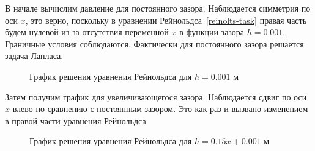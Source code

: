 \documentclass[a4paper,14pt]{extarticle}
\begin{document}
В начале вычислим давление для постоянного зазора. Наблюдается симметрия по оси $x$, это верно, поскольку в уравнении Рейнольдса~\eqref{reinolts-task} правая часть будем нулевой из-за отсутствия переменной $x$ в функции зазора $h = 0.001$. Граничные условия соблюдаются. Фактически для постоянного зазора решается задача Лапласа.
\begin{figure}[!htbp]
	\caption{График решения уравнения Рейнольдса для $h = 0.001$ м}
	\label{res_static}
\end{figure}

Затем получим график для увеличивающегося зазора. Наблюдается сдвиг по оси $x$ влево по сравнению с постоянным зазором. Это как раз и вызвано изменением в правой части уравнения Рейнольдса
\begin{figure}[!htbp]
	\caption{График решения уравнения Рейнольдса для $h = 0.15 x + 0.001$ м}
	\label{res_pos}
\end{figure}
\end{document}
